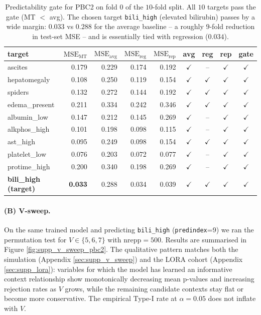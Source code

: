 \documentclass[AMA,Times1COL]{WileyNJDv5} %
\begin{document}
\begin{table}[ht]
\centering
\small
\begin{tabular}{l r r r r c c c c}
\toprule
target & $\mathrm{MSE}_{\mathrm{MT}}$ & $\mathrm{MSE}_{\mathrm{avg}}$ & $\mathrm{MSE}_{\mathrm{reg}}$ & $\mathrm{MSE}_{\mathrm{rep}}$ & avg & reg & rep & gate \\
\midrule
ascites & 0.179 & 0.229 & 0.174 & 0.192 & $\checkmark$ & -- & $\checkmark$ & $\checkmark$ \\
hepatomegaly & 0.108 & 0.250 & 0.119 & 0.154 & $\checkmark$ & $\checkmark$ & $\checkmark$ & $\checkmark$ \\
spiders & 0.132 & 0.272 & 0.144 & 0.192 & $\checkmark$ & $\checkmark$ & $\checkmark$ & $\checkmark$ \\
edema\_present & 0.211 & 0.334 & 0.242 & 0.346 & $\checkmark$ & $\checkmark$ & $\checkmark$ & $\checkmark$ \\
albumin\_low & 0.147 & 0.212 & 0.145 & 0.269 & $\checkmark$ & -- & $\checkmark$ & $\checkmark$ \\
alkphos\_high & 0.101 & 0.198 & 0.098 & 0.115 & $\checkmark$ & -- & $\checkmark$ & $\checkmark$ \\
ast\_high & 0.095 & 0.249 & 0.098 & 0.154 & $\checkmark$ & $\checkmark$ & $\checkmark$ & $\checkmark$ \\
platelet\_low & 0.076 & 0.203 & 0.072 & 0.077 & $\checkmark$ & -- & $\checkmark$ & $\checkmark$ \\
protime\_high & 0.200 & 0.340 & 0.198 & 0.269 & $\checkmark$ & -- & $\checkmark$ & $\checkmark$ \\
\textbf{bili\_high (target)} & \textbf{0.033} & 0.288 & 0.034 & 0.039 & $\checkmark$ & $\checkmark$ & $\checkmark$ & \textbf{$\checkmark$} \\
\bottomrule
\end{tabular}
\caption{Predictability gate for PBC2 on fold $0$ of the $10$-fold split. All $10$ targets pass the gate (MT $<$ avg). The chosen target \texttt{bili\_high} (elevated bilirubin) passes by a wide margin: $0.033$ vs $0.288$ for the average baseline -- a roughly $9$-fold reduction in test-set MSE -- and is essentially tied with regression ($0.034$).}
\label{tab:supp_gate_pbc2}
\end{table}

\paragraph*{(B) V-sweep.} On the same trained model and predicting \texttt{bili\_high} (\texttt{predindex}=9) we ran the permutation test for $V \in \{5, 6, 7\}$ with $\mathrm{nrepp}=500$. Results are summarised in Figure \ref{fig:supp_v_sweep_pbc2}. The qualitative pattern matches both the simulation (Appendix \ref{sec:supp_v_sweep}) and the LORA cohort (Appendix \ref{sec:supp_lora}): variables for which the model has learned an informative context relationship show monotonically decreasing mean p-values and increasing rejection rates as $V$ grows, while the remaining candidate contexts stay flat or become more conservative. The empirical Type-I rate at $\alpha=0.05$ does not inflate with $V$.
\end{document}
